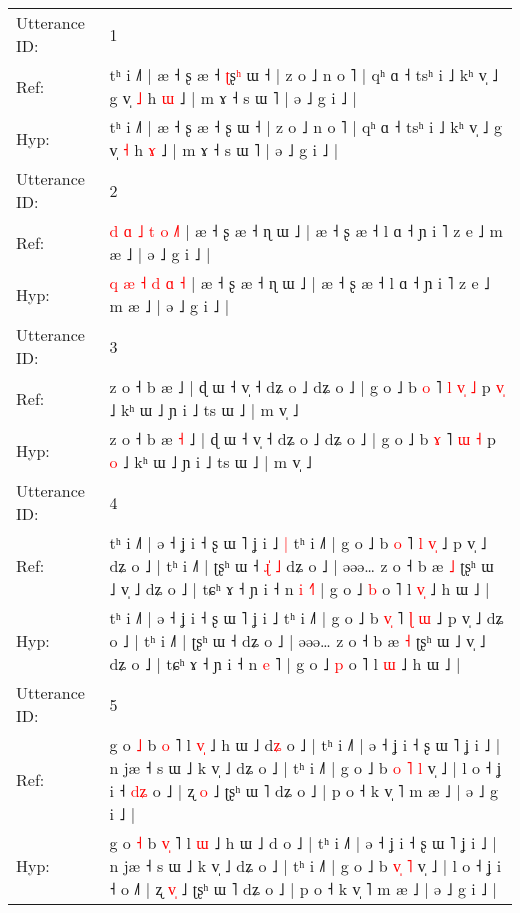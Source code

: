 \documentclass[10pt]{article}
\DeclareRobustCommand{\hl}[1]{{\textcolor{red}{#1}}}
\begin{document}
\begin{longtable}{ll}
\toprule
Utterance ID: & 1 \\
Ref: & tʰ i ˩˥ | æ ˧ ʂ æ ˧ \hl{ʈ}ʂ\hl{ʰ} ɯ ˧ | z o ˩ n o ˥ | qʰ ɑ ˧ tsʰ i ˩ kʰ v̩ ˩ g v̩ \hl{˩} h \hl{ɯ} ˩ | m ɤ ˧ s ɯ ˥ | ə ˩ g i ˩ |
 \\
Hyp: & tʰ i ˩˥ | æ ˧ ʂ æ ˧ \hl{}ʂ\hl{} ɯ ˧ | z o ˩ n o ˥ | qʰ ɑ ˧ tsʰ i ˩ kʰ v̩ ˩ g v̩ \hl{˧} h \hl{ɤ} ˩ | m ɤ ˧ s ɯ ˥ | ə ˩ g i ˩ |
 \\
\midrule
Utterance ID: & 2 \\
Ref: & \hl{d} \hl{ɑ} \hl{˩} \hl{t} \hl{o} \hl{˩}\hl{˥} | æ ˧ ʂ æ ˧ ɳ ɯ ˩ | æ ˧ ʂ æ ˧ l ɑ ˧ ɲ i ˥ z e ˩ m æ ˩ | ə ˩ g i ˩ |
 \\
Hyp: & \hl{q} \hl{æ} \hl{˧} \hl{d} \hl{ɑ} \hl{}\hl{˧} | æ ˧ ʂ æ ˧ ɳ ɯ ˩ | æ ˧ ʂ æ ˧ l ɑ ˧ ɲ i ˥ z e ˩ m æ ˩ | ə ˩ g i ˩ |
 \\
\midrule
Utterance ID: & 3 \\
Ref: & z o ˧ b æ\hl{}\hl{} ˩ | ɖ ɯ ˧ v̩ ˧ dʑ o ˩ dʑ o ˩ | g o ˩ b \hl{o} ˥\hl{ }\hl{l} \hl{v}\hl{̩} \hl{˩} p \hl{v}\hl{̩} ˩ kʰ ɯ ˩ ɲ i ˩ ts ɯ ˩ | m v̩ ˩
 \\
Hyp: & z o ˧ b æ\hl{ }\hl{˧} ˩ | ɖ ɯ ˧ v̩ ˧ dʑ o ˩ dʑ o ˩ | g o ˩ b \hl{ɤ} ˥\hl{}\hl{} \hl{}\hl{ɯ} \hl{˧} p \hl{}\hl{o} ˩ kʰ ɯ ˩ ɲ i ˩ ts ɯ ˩ | m v̩ ˩
 \\
\midrule
Utterance ID: & 4 \\
Ref: & tʰ i ˩˥ | ə ˧ ʝ i ˧ ʂ ɯ ˥ ʝ i ˩\hl{ }\hl{|} tʰ i ˩˥ | g o ˩ b \hl{}\hl{o} ˥ \hl{l} \hl{v}\hl{̩} ˩ p v̩ ˩ dʑ o ˩ | tʰ i ˩˥ | ʈʂʰ ɯ ˧\hl{ }\hl{ɻ}\hl{̍}\hl{ }\hl{˩} dʑ o ˩ | əəə… z o ˧ b æ \hl{˩} ʈʂʰ ɯ ˩ v̩ ˩ dʑ o ˩ | tɕʰ ɤ ˧ ɲ i ˧ n \hl{i} \hl{˧}˥ | g o ˩ \hl{b} o ˥ l \hl{v}\hl{̩} ˩ h ɯ ˩ |
 \\
Hyp: & tʰ i ˩˥ | ə ˧ ʝ i ˧ ʂ ɯ ˥ ʝ i ˩\hl{}\hl{} tʰ i ˩˥ | g o ˩ b \hl{v}\hl{̩} ˥ \hl{ɭ} \hl{}\hl{ɯ} ˩ p v̩ ˩ dʑ o ˩ | tʰ i ˩˥ | ʈʂʰ ɯ ˧\hl{}\hl{}\hl{}\hl{}\hl{} dʑ o ˩ | əəə… z o ˧ b æ \hl{˧} ʈʂʰ ɯ ˩ v̩ ˩ dʑ o ˩ | tɕʰ ɤ ˧ ɲ i ˧ n \hl{e} \hl{}˥ | g o ˩ \hl{p} o ˥ l \hl{}\hl{ɯ} ˩ h ɯ ˩ |
 \\
\midrule
Utterance ID: & 5 \\
Ref: & g o \hl{˩} b \hl{}\hl{o} ˥ l \hl{v}\hl{̩} ˩ h ɯ ˩ d\hl{ʑ} o ˩ | tʰ i ˩˥ | ə ˧ ʝ i ˧ ʂ ɯ ˥ ʝ i ˩ | n jæ ˧ s ɯ ˩ k v̩ ˩ dʑ o ˩ | tʰ i ˩˥ | g o ˩ b \hl{o}\hl{ }\hl{˥} \hl{l} v̩ ˩ | l o ˧ ʝ i ˧\hl{ }\hl{d}\hl{ʑ} o ˩\hl{} | ʐ \hl{}\hl{o} ˩ ʈʂʰ ɯ ˥ dʑ o ˩ | p o ˧ k v̩ ˥ m æ ˩ | ə ˩ g i ˩ |
 \\
Hyp: & g o \hl{˧} b \hl{v}\hl{̩} ˥ l \hl{}\hl{ɯ} ˩ h ɯ ˩ d\hl{} o ˩ | tʰ i ˩˥ | ə ˧ ʝ i ˧ ʂ ɯ ˥ ʝ i ˩ | n jæ ˧ s ɯ ˩ k v̩ ˩ dʑ o ˩ | tʰ i ˩˥ | g o ˩ b \hl{}\hl{v}\hl{̩} \hl{˥} v̩ ˩ | l o ˧ ʝ i ˧\hl{}\hl{}\hl{} o ˩\hl{˥} | ʐ \hl{v}\hl{̩} ˩ ʈʂʰ ɯ ˥ dʑ o ˩ | p o ˧ k v̩ ˥ m æ ˩ | ə ˩ g i ˩ |

\end{longtable}
\end{document}
